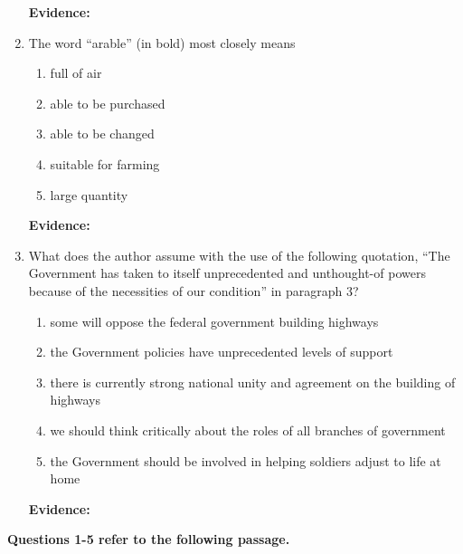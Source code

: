 \begin{enumerate}
\bigskip
\textbf{Evidence:} \hrulefill

\bigskip
\item The word ``arable'' (in bold) most closely means

\bigskip
\begin{enumerate}[label=(\Alph*)]
\item full of air
\item able to be purchased
\item able to be changed
\item suitable for farming
\item large quantity
\end{enumerate}

\bigskip
\textbf{Evidence:} \hrulefill


\bigskip
\item What does the author assume with the use of the following quotation, ``The Government has taken to itself unprecedented and unthought-of powers because of the necessities of our condition'' in paragraph 3?

\bigskip
\begin{enumerate}[label=(\Alph*)]
\item some will oppose the federal government building highways
\item the Government policies have unprecedented levels of support
\item there is currently strong national unity and agreement on the building of highways
\item we should think critically about the roles of all branches of government
\item the Government should be involved in helping soldiers adjust to life at home
\end{enumerate}

\bigskip
\textbf{Evidence:} \hrulefill

\end{enumerate}

\bigskip
\textbf{Questions 1-5 refer to the following passage.}

